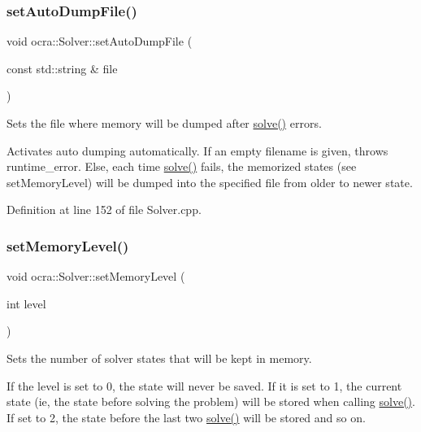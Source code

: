 \hypertarget{classocra_1_1Solver_a913b2bf9a6d9f64c70ad1b5fbb09172f}{}\label{classocra_1_1Solver_a913b2bf9a6d9f64c70ad1b5fbb09172f} 
\subsubsection{\texorpdfstring{set\+Auto\+Dump\+File()}{setAutoDumpFile()}}
{\footnotesize\ttfamily void ocra\+::\+Solver\+::set\+Auto\+Dump\+File (\begin{DoxyParamCaption}\item[{const std\+::string \&}]{file }\end{DoxyParamCaption})}

Sets the file where memory will be dumped after \hyperlink{classocra_1_1Solver_a86151fea09399da16d6ce47abb1ba904}{solve()} errors.

Activates auto dumping automatically. If an empty filename is given, throws runtime\+\_\+error. Else, each time \hyperlink{classocra_1_1Solver_a86151fea09399da16d6ce47abb1ba904}{solve()} fails, the memorized states (see set\+Memory\+Level) will be dumped into the specified file from older to newer state. 

Definition at line 152 of file Solver.\+cpp.

\hypertarget{classocra_1_1Solver_a173cf07771133096beec4a7d5aefe00d}{}\label{classocra_1_1Solver_a173cf07771133096beec4a7d5aefe00d} 
\subsubsection{\texorpdfstring{set\+Memory\+Level()}{setMemoryLevel()}}
{\footnotesize\ttfamily void ocra\+::\+Solver\+::set\+Memory\+Level (\begin{DoxyParamCaption}\item[{int}]{level }\end{DoxyParamCaption})}

Sets the number of solver states that will be kept in memory.

If the level is set to 0, the state will never be saved. If it is set to 1, the current state (ie, the state before solving the problem) will be stored when calling \hyperlink{classocra_1_1Solver_a86151fea09399da16d6ce47abb1ba904}{solve()}. If set to 2, the state before the last two \hyperlink{classocra_1_1Solver_a86151fea09399da16d6ce47abb1ba904}{solve()} will be stored and so on. 

